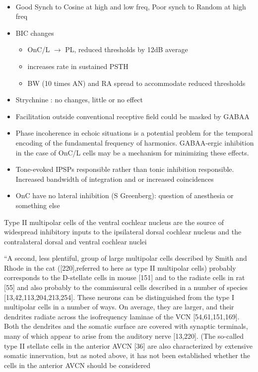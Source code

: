 \documentclass[10pt,a4paper]{article}
\begin{document}
\citep{EvansZhao:1993} \ \


\begin{itemize}
\item Good Synch to Cosine at high and low freq, Poor synch to Random at high
  freq
\item BIC changes

  \begin{itemize}
  \item OnC/L \ensuremath{\rightarrow} PL, reduced thresholds by 12dB average
  \item increases rate in sustained PSTH
  \item BW (10 times AN) and RA spread to accommodate reduced thresholds
  \end{itemize}
\item Strychnine : no changes, little or no effect
\item Facilitation outside conventional receptive field could be masked by GABAA
  \citep{JiangPalmerEtAl:1996,WinterPalmer:1995}
\item Phase incoherence in echoic situations is a potential problem for the
  temporal encoding of the fundamental frequency of harmonics.  GABAA{}-ergic
  inhibition in the case of OnC/L cells may be a mechanism for minimizing these
  effects.
\item Tone-evoked IPSPs responsible rather than tonic inhibition
  responsible. Increased bandwidth of integration and or increased coincidences
\item OnC have no lateral inhibition (S Greenberg): question of anesthesia or
  something else
\end{itemize}
\citep{CantBenson:2003} Type II multipolar cells of the ventral cochlear nucleus
are the source of widespread inhibitory inputs to the ipsilateral dorsal
cochlear nucleus and the contralateral dorsal and ventral cochlear nuclei

{\textquotedblleft}A second, less plentiful, group of large multipolar cells
described by Smith and Rhode in the cat ([220],referred to here as type II
multipolar cells) probably corresponds to the D-stellate cells in mouse [151]
and to the radiate cells in rat [55] and also probably to the commissural cells
described in a number of species [13,42,113,204,213,254]. These neurons can be
distinguished from the type I multipolar cells in a number of ways. On average,
they are larger, and their dendrites radiate across the isofrequency laminae of
the VCN [54,61,151,169]. Both the dendrites and the somatic surface are covered
with synaptic terminals, many of which appear to arise from the auditory nerve
[13,220]. (The so-called type II stellate cells in the anterior AVCN [36] are
also characterized by extensive somatic innervation, but as noted above, it has
not been established whether the cells in the anterior AVCN should be considered
\end{document}
